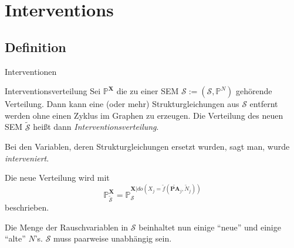 \section{Interventions}
\subsection{Definition}
\begin{frame}{Interventionen}
    \begin{block}{Interventionsverteilung}
        Sei $\mathbb{P}^\mathbf{X}$ die zu einer SEM
        $\mathcal{S} := (\mathcal{S}, \mathbb{P}^N)$ gehörende Verteilung. Dann
        kann eine (oder mehr) Strukturgleichungen aus $\mathcal{S}$ entfernt
        werden ohne einen Zyklus im Graphen zu erzeugen. Die Verteilung des
        neuen SEM $\tilde{\mathcal{S}}$ heißt dann
        \textit{Interventionsverteilung}.

        Bei den Variablen, deren Strukturgleichungen ersetzt wurden, sagt man,
        wurde \textit{interveniert}.

        Die neue Verteilung wird mit
        \[\mathbb{P}_{\tilde{\mathcal{S}}}^{\mathbf{X}} = \mathbb{P}_{\mathcal{S}}^{\mathbf{X}| do(X_j=\tilde{f}(\tilde{\mathbf{PA}}_j, \tilde{N}_j))}\]
        beschrieben.

        Die Menge der Rauschvariablen in $\mathcal{S}$ beinhaltet nun einige
        \enquote{neue} und einige \enquote{alte} $N$'s. $\mathcal{S}$ muss
        paarweise unabhängig sein.
    \end{block}
\end{frame}



